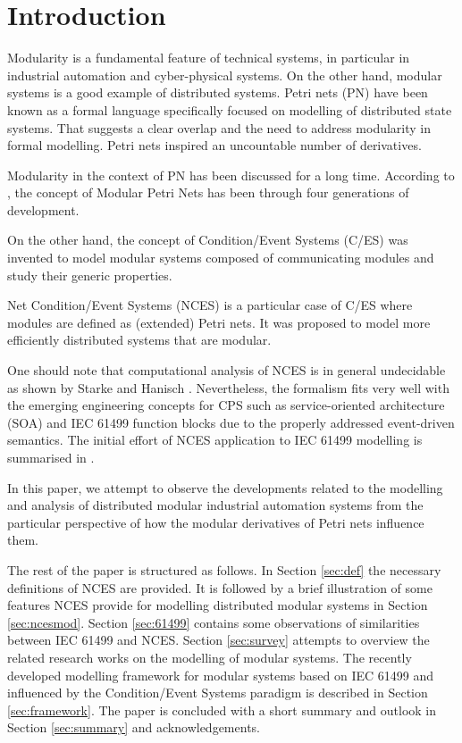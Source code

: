 \documentclass[runningheads]{llncs}
\begin{document}
\lstset{language=xml,
       basicstyle=\ttfamily\scriptsize
     }

\section{Introduction}
Modularity is a fundamental feature of technical systems, in particular in industrial automation and cyber-physical systems.
On the other hand, modular systems is a good example of distributed systems.
Petri nets (PN) have been known as a formal language specifically focused on modelling of distributed state systems. That suggests a clear overlap and the need to address modularity in formal modelling. Petri nets inspired an uncountable number of derivatives.

Modularity in the context of PN has been discussed for a long time. 
According to \cite{davidrajuh2019new}, the concept of Modular Petri Nets has been through four generations of development. 

On the other hand, the concept of Condition/Event Systems (C/ES)
 \cite{sreenivas1991condition} was invented to model modular systems composed of communicating modules and study their generic properties.

Net Condition/Event Systems (NCES) \cite{rausch1995net} is a particular case of C/ES where modules are defined as (extended) Petri nets. It was proposed to model more efficiently distributed systems that are modular. 

One should note that computational analysis of NCES is in general undecidable as shown by Starke and Hanisch \cite{starke1997analysis}. Nevertheless, the formalism fits very well with the emerging engineering concepts for CPS such as service-oriented architecture (SOA) and IEC 61499 function blocks due to the properly addressed event-driven semantics. The initial effort of NCES application to IEC 61499 modelling is summarised in \cite{hanisch2009one}.

In this paper, we attempt to observe the developments related to the modelling and analysis of distributed modular industrial automation systems from the particular perspective of how the modular derivatives of Petri nets influence them.

The rest of the paper is structured as follows. In Section \ref{sec:def} the necessary definitions of NCES are provided. It is followed by a brief illustration of some features NCES provide for modelling distributed modular systems in Section \ref{sec:ncesmod}. Section \ref{sec:61499} contains some observations of similarities between IEC 61499 and NCES. Section \ref{sec:survey} attempts to overview the related research works on the modelling of modular systems. The recently developed modelling framework for modular systems based on IEC 61499 and influenced by the Condition/Event Systems paradigm is described in Section \ref{sec:framework}. The paper is concluded with a short summary and outlook in Section \ref{sec:summary} and acknowledgements. 
\end{document}
